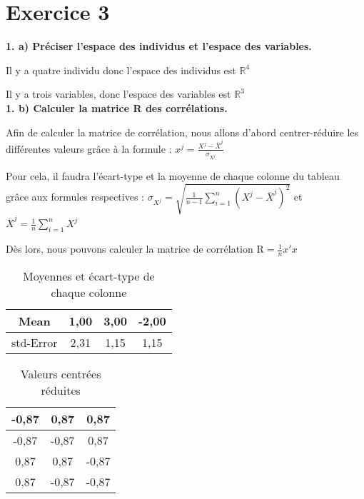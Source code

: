 \newpage \section*{Exercice 3}

\noindent \textbf{1. a) Préciser l’espace des individus et l’espace des variables.}

\noindent Il y a quatre individu donc l'espace des individus est $\mathbb{R}^4$

\noindent Il y a trois variables, donc l'espace des variables est $\mathbb{R}^3$\\

\noindent \textbf{1. b) Calculer la matrice R des corrélations. }

Afin de calculer la matrice de corrélation, nous allons d'abord centrer-réduire les différentes valeurs grâce à la formule : $x^j = \frac{\displaystyle X^j-\overline{X}^j}{\displaystyle \sigma_{X^j}}$

Pour cela, il faudra l'écart-type et la moyenne de chaque colonne du tableau grâce aux formules respectives : $\sigma_{X^j}=\sqrt{\frac{\displaystyle 1}{\displaystyle n-1} \displaystyle  \sum_{i=1}^{n} \displaystyle \left(X^j - \overline{X}^j\right)^2}$ et $\overline{X}^j = \frac{\displaystyle 1}{\displaystyle n} \displaystyle \sum_{i=1}^{n} X^j$ 


Dès lors, nous pouvons calculer la matrice de corrélation $\text{R}=\frac{\displaystyle 1}{\displaystyle  n}x'x$


\begin{table}[htbp]
	\centering
	\begin{tabular}{c|c|c|c}
		\hline
		Mean   & 1,00   & 3,00   & -2,00 \\ \hline
		std-Error & 2,31   & 1,15   & 1,15 \\ \hline
	\end{tabular}%
	\caption{Moyennes et écart-type de chaque colonne}
\end{table}%

\begin{table}[htbp]
	\centering
	
	\begin{tabular}{c|c|c}
		\hline
		-0,87  & 0,87   & 0,87 \\ \hline
		-0,87  & -0,87  & 0,87 \\ \hline
		0,87   & 0,87   & -0,87 \\ \hline
		0,87   & -0,87  & -0,87 \\ \hline
	\end{tabular}%
	\caption{{Valeurs centrées réduites}}
\end{table}%


